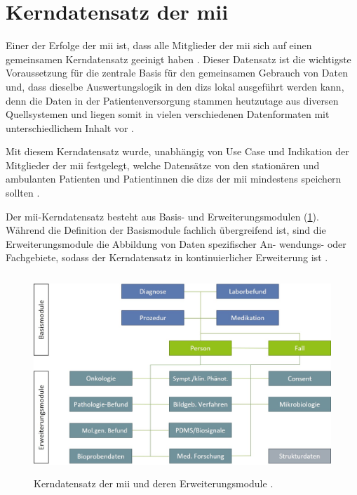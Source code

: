 \section{Kerndatensatz der \acs{mii}} \label{sec:miikdz}

Einer der Erfolge der \ac{mii} ist, dass alle Mitglieder der \ac{mii} sich auf einen gemeinsamen Kerndatensatz geeinigt haben \cite{telemedizin, miikdz}. Dieser Datensatz ist die wichtigste Voraussetzung für die zentrale Basis für den gemeinsamen Gebrauch von Daten und, dass dieselbe Auswertungslogik in den \acp{diz} lokal ausgeführt werden kann, denn die Daten in der Patientenversorgung stammen heutzutage aus diversen Quellsystemen und liegen somit in vielen verschiedenen Datenformaten mit unterschiedlichem Inhalt vor \cite{miikdz}. 

Mit diesem Kerndatensatz wurde, unabhängig von Use Case und Indikation der Mitglieder der \ac{mii} festgelegt, welche Datensätze von den stationären und ambulanten Patienten und Patientinnen die \acp{diz} der \ac{mii} mindestens speichern sollten \cite{miikdz}.

Der \ac{mii}-Kerndatensatz besteht aus Basis- und Erweiterungsmodulen (\ref{fig:mii}). Während die Definition der Basismodule fachlich übergreifend ist, sind die Erweiterungsmodule die Abbildung von Daten spezifischer An- wendungs- oder Fachgebiete, sodass der Kerndatensatz in kontinuierlicher Erweiterung ist \cite{miikdz}.

\clearpage

\begin{figure}[ht]
	\centering
	\includegraphics[height=7.5cm]{figures/MIIModule}
	\caption[Kerndatensatz der \acs{mii}]{Kerndatensatz der \acs{mii} und deren Erweiterungsmodule \cite{miikdz}.}
	\label{fig:mii}
\end{figure}

